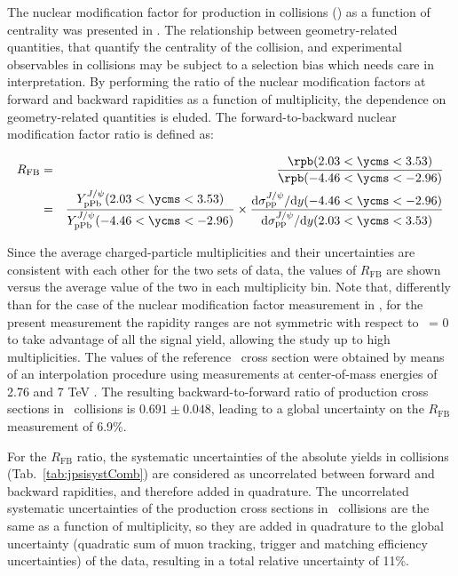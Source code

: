 The nuclear modification factor for \jpsi production in \ppb collisions (\rpb) as a function of centrality was presented in \cite{Adam:2015jsa}. The relationship between geometry-related quantities, that quantify the centrality of the collision, and experimental observables in \ppb collisions may be subject to a selection bias \cite{Adam:2015aa} which needs care in interpretation. 
By performing the ratio of the nuclear modification factors at forward and backward rapidities as a function of multiplicity, the dependence on geometry-related quantities is eluded. The forward-to-backward nuclear modification factor ratio is defined as:

\begin{eqnarray} \label{rfb}
R_{\mathrm{FB}} &=& \frac{\rpb(2.03 < \ycms < 3.53)}{\rpb(-4.46 < \ycms < -2.96)} \\ \nonumber
 &=& \frac{Y^{J/\psi}_{\mathrm{pPb}} (2.03 < \ycms < 3.53)}{Y^{J/\psi}_{\mathrm{pPb}} (-4.46 < \ycms < -2.96)} \times
    \frac{\mathrm{d}\sigma^{J/\psi}_{\mathrm{pp}}/\mathrm{d}y (-4.46 < \ycms <
    -2.96)}{\mathrm{d}\sigma^{J/\psi}_{\mathrm{pp}}/\mathrm{d}y (2.03 < \ycms < 3.53) }
\end{eqnarray}

Since the average charged-particle multiplicities and their uncertainties are consistent with each other for the two sets of data, the values of $R_{\mathrm{FB}}$ are shown versus the average value of the two in each multiplicity bin. Note that, differently than for the case of the nuclear modification factor measurement in \cite{Abelev:2014aa}, for the present measurement the rapidity ranges are not symmetric with respect to \ycms ~= 0 to take advantage of all the signal yield, allowing the study up to high multiplicities. 
The values of the reference \pp ~cross section were obtained by means of an interpolation procedure using measurements at center-of-mass energies of 2.76 and 7 TeV \cite{ALICELHCbRefpp}. The resulting backward-to-forward ratio of \jpsi production cross sections in \pp ~collisions is $ 0.691 \pm 0.048$, leading to a global uncertainty on the $R_{\mathrm{FB}}$ measurement of 6.9\%.

For the $R_{\mathrm{FB}}$ ratio, the systematic uncertainties of the absolute yields in \ppb collisions (Tab.~\ref{tab:jpsisystComb}) are considered as uncorrelated between forward and backward rapidities, and therefore added in quadrature. The uncorrelated systematic uncertainties of the production cross sections in \pp ~collisions are the same as a function of multiplicity, so they are added in quadrature to the global uncertainty (quadratic sum of muon tracking, trigger and matching efficiency uncertainties) of the \ppb data, resulting in a total relative uncertainty of 11\%.

